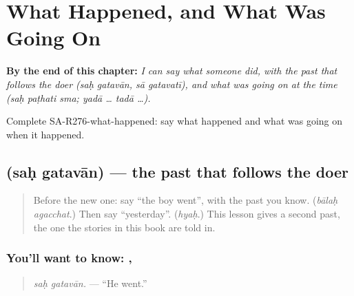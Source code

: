 
\chapter{What Happened, and What Was Going On}
\label{ch:sa-what-happened-and-what-was-going-on}

\begin{chapteropening}
\textbf{By the end of this chapter:} \emph{I can say what someone did, with the past that follows the doer (saḥ gatavān, sā gatavatī), and what was going on at the time (saḥ paṭhati sma; yadā … tadā …).}

Complete SA-R276-what-happened: say what happened and what was going on when it happened.
\end{chapteropening}

\section[\texorpdfstring{\sk{सः} \sk{गतवान्} (saḥ gatavān)}{सः गतवान् (saḥ gatavān)}]{  (saḥ gatavān) — the past that follows the doer}

\label{lesson:SA-C276-sah-gatavan}



\begin{quote}
Before the new one: say \textquotedblleft{}the boy went\textquotedblright{}, with the past you know. (\emph{bālaḥ agacchat}.) Then say \textquotedblleft{}yesterday\textquotedblright{}. (\emph{hyaḥ}.) This lesson gives a second past, the one the stories in this book are told in.
\end{quote}

\subsection*{You'll want to know: , }
\begin{quote}
\textbf{ }
\end{quote}

\begin{quote}
\emph{saḥ gatavān.} — \textquotedblleft{}He went.\textquotedblright{}
\end{quote}

